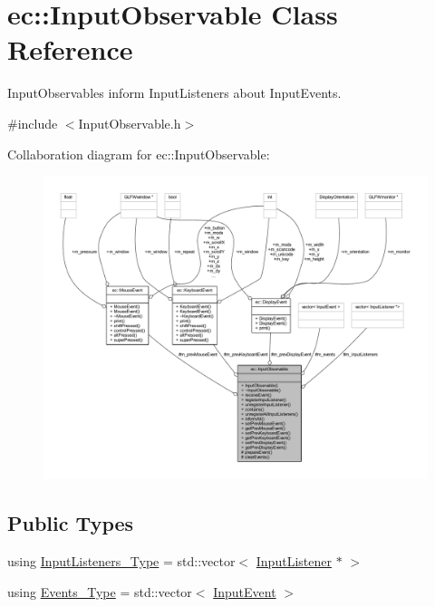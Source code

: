 \hypertarget{classec_1_1_input_observable}{}\section{ec\+:\+:Input\+Observable Class Reference}
\label{classec_1_1_input_observable}


Input\+Observables inform Input\+Listeners about Input\+Events.  




{\ttfamily \#include $<$Input\+Observable.\+h$>$}



Collaboration diagram for ec\+:\+:Input\+Observable\+:\nopagebreak
\begin{figure}[H]
\begin{center}
\leavevmode
\includegraphics[width=350pt]{classec_1_1_input_observable__coll__graph}
\end{center}
\end{figure}
\subsection*{Public Types}
\begin{DoxyCompactItemize}
\item 
using \mbox{\hyperlink{classec_1_1_input_observable_a7a1e7fe634b426e59ddae7f11c21bebb}{Input\+Listeners\+\_\+\+Type}} = std\+::vector$<$ \mbox{\hyperlink{classec_1_1_input_listener}{Input\+Listener}} $\ast$ $>$
\item 
using \mbox{\hyperlink{classec_1_1_input_observable_ac2476cc82c72ba20dcd8d5c89794f577}{Events\+\_\+\+Type}} = std\+::vector$<$ \mbox{\hyperlink{structec_1_1_input_event}{Input\+Event}} $>$
\end{DoxyCompactItemize}
